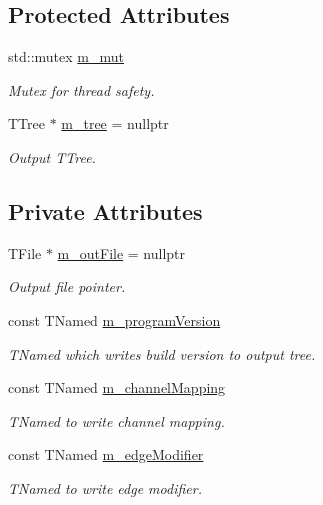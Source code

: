 \subsection*{Protected Attributes}
\begin{DoxyCompactItemize}
\item 
std\+::mutex \hyperlink{class_root_manager_a8f8a185d6d25b3e1207416c7cd8c333c}{m\+\_\+mut}
\begin{DoxyCompactList}\small\item\em Mutex for thread safety. \end{DoxyCompactList}\item 
T\+Tree $\ast$ \hyperlink{class_root_manager_adfbcbba0248787d08a230508bb4136a6}{m\+\_\+tree} = nullptr
\begin{DoxyCompactList}\small\item\em Output T\+Tree. \end{DoxyCompactList}\end{DoxyCompactItemize}
\subsection*{Private Attributes}
\begin{DoxyCompactItemize}
\item 
T\+File $\ast$ \hyperlink{class_root_manager_a2f0257574f0eeac21c3628058a5d6ad9}{m\+\_\+out\+File} = nullptr
\begin{DoxyCompactList}\small\item\em Output file pointer. \end{DoxyCompactList}\item 
const T\+Named \hyperlink{class_root_manager_a14d81290e5a98ec6f62459f1016e7dcc}{m\+\_\+program\+Version}
\begin{DoxyCompactList}\small\item\em T\+Named which writes build version to output tree. \end{DoxyCompactList}\item 
const T\+Named \hyperlink{class_root_manager_a4d92834cf49004700cafa3afa3659cd5}{m\+\_\+channel\+Mapping}
\begin{DoxyCompactList}\small\item\em T\+Named to write channel mapping. \end{DoxyCompactList}\item 
const T\+Named \hyperlink{class_root_manager_a3f17186761c3e5b61e569bc3f3946ddb}{m\+\_\+edge\+Modifier}
\begin{DoxyCompactList}\small\item\em T\+Named to write edge modifier. \end{DoxyCompactList}\end{DoxyCompactItemize}


